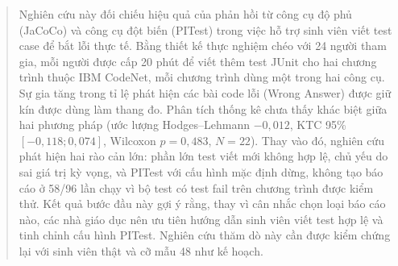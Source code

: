 \begin{abstract}
Nghiên cứu này đối chiếu hiệu quả của phản hồi từ công cụ độ phủ (JaCoCo) và công cụ đột biến (PITest) trong việc hỗ trợ sinh viên viết test case để bắt lỗi thực tế. Bằng thiết kế thực nghiệm chéo với 24 người tham gia, mỗi người được cấp 20 phút để viết thêm test JUnit cho hai chương trình thuộc IBM CodeNet, mỗi chương trình dùng một trong hai công cụ. Sự gia tăng trong tỉ lệ phát hiện các bài code lỗi (Wrong Answer) được giữ kín được dùng làm thang đo. Phân tích thống kê chưa thấy khác biệt giữa hai phương pháp (ước lượng Hodges--Lehmann $-0,012$, KTC 95\% $[-0,118; 0,074]$, Wilcoxon $p = 0,483$, $N = 22$). Thay vào đó, nghiên cứu phát hiện hai rào cản lớn: phần lớn test viết mới không hợp lệ, chủ yếu do sai giá trị kỳ vọng, và PITest với cấu hình mặc định dừng, không tạo báo cáo ở 58/96 lần chạy vì bộ test có test fail trên chương trình được kiểm thử. Kết quả bước đầu này gợi ý rằng, thay vì cân nhắc chọn loại báo cáo nào, các nhà giáo dục nên ưu tiên hướng dẫn sinh viên viết test hợp lệ và tinh chỉnh cấu hình PITest. Nghiên cứu thăm dò này cần được kiểm chứng lại với sinh viên thật và cỡ mẫu 48 như kế hoạch.
\end{abstract}
